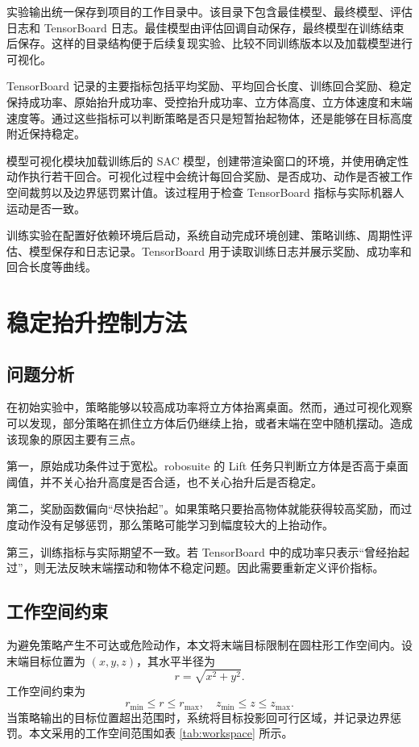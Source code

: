 \documentclass[
    type = bachelor,
    oneside,
    fontset = fandol
]{njuthesis}
\begin{document}
实验输出统一保存到项目的工作目录中。该目录下包含最佳模型、最终模型、评估日志和 TensorBoard 日志。最佳模型由评估回调自动保存，最终模型在训练结束后保存。这样的目录结构便于后续复现实验、比较不同训练版本以及加载模型进行可视化。

TensorBoard 记录的主要指标包括平均奖励、平均回合长度、训练回合奖励、稳定保持成功率、原始抬升成功率、受控抬升成功率、立方体高度、立方体速度和末端速度等。通过这些指标可以判断策略是否只是短暂抬起物体，还是能够在目标高度附近保持稳定。


模型可视化模块加载训练后的 SAC 模型，创建带渲染窗口的环境，并使用确定性动作执行若干回合。可视化过程中会统计每回合奖励、是否成功、动作是否被工作空间裁剪以及边界惩罚累计值。该过程用于检查 TensorBoard 指标与实际机器人运动是否一致。

训练实验在配置好依赖环境后启动，系统自动完成环境创建、策略训练、周期性评估、模型保存和日志记录。TensorBoard 用于读取训练日志并展示奖励、成功率和回合长度等曲线。

\section{稳定抬升控制方法}

\subsection{问题分析}

在初始实验中，策略能够以较高成功率将立方体抬离桌面。然而，通过可视化观察可以发现，部分策略在抓住立方体后仍继续上抬，或者末端在空中随机摆动。造成该现象的原因主要有三点。

第一，原始成功条件过于宽松。robosuite 的 Lift 任务只判断立方体是否高于桌面阈值，并不关心抬升高度是否合适，也不关心抬升后是否稳定。

第二，奖励函数偏向“尽快抬起”。如果策略只要抬高物体就能获得较高奖励，而过度动作没有足够惩罚，那么策略可能学习到幅度较大的上抬动作。

第三，训练指标与实际期望不一致。若 TensorBoard 中的成功率只表示“曾经抬起过”，则无法反映末端摆动和物体不稳定问题。因此需要重新定义评价指标。

\subsection{工作空间约束}

为避免策略产生不可达或危险动作，本文将末端目标限制在圆柱形工作空间内。设末端目标位置为 $(x,y,z)$，其水平半径为
\begin{equation}
  r=\sqrt{x^2+y^2}.
\end{equation}
工作空间约束为
\begin{equation}
  r_{\min}\le r \le r_{\max}, \quad z_{\min}\le z \le z_{\max}.
\end{equation}
当策略输出的目标位置超出范围时，系统将目标投影回可行区域，并记录边界惩罚。本文采用的工作空间范围如表 \ref{tab:workspace} 所示。
\end{document}
